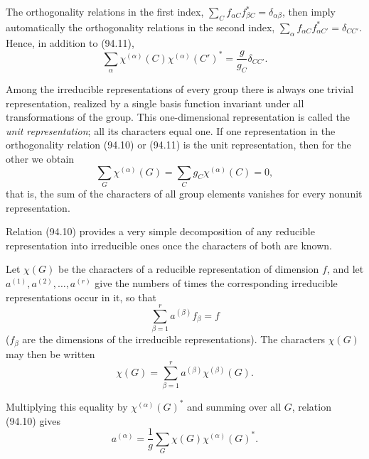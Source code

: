 The orthogonality relations in the first index, $\sum_Cf_{\alpha C}f_{\beta C}^*=\delta_{\alpha\beta}$, then imply automatically the orthogonality relations in the second index, $\sum_\alpha f_{\alpha C}f_{\alpha C'}^*=\delta_{CC'}$. Hence, in addition to (94.11),
\begin{equation}
 \sum_\alpha\chi^{(\alpha)}(C)\chi^{(\alpha)}(C')^*=\frac{g}{g_C}\delta_{CC'}.
 \tag{94.12}
\end{equation}

Among the irreducible representations of every group there is always one trivial representation, realized by a single basis function invariant under all transformations of the group. This one-dimensional representation is called the \emph{unit representation}; all its characters equal one. If one representation in the orthogonality relation (94.10) or (94.11) is the unit representation, then for the other we obtain
\begin{equation}
 \sum_G\chi^{(\alpha)}(G)=\sum_Cg_C\chi^{(\alpha)}(C)=0,
 \tag{94.13}
\end{equation}
that is, the sum of the characters of all group elements vanishes for every nonunit representation.

Relation (94.10) provides a very simple decomposition of any reducible representation into irreducible ones once the characters of both are known.

Let $\chi(G)$ be the characters of a reducible representation of dimension $f$, and let $a^{(1)},a^{(2)},\ldots,a^{(r)}$ give the numbers of times the corresponding irreducible representations occur in it, so that
\begin{equation}
 \sum_{\beta=1}^ra^{(\beta)}f_\beta=f
 \tag{94.14}
\end{equation}
($f_\beta$ are the dimensions of the irreducible representations). The characters $\chi(G)$ may then be written
\begin{equation}
 \chi(G)=\sum_{\beta=1}^ra^{(\beta)}\chi^{(\beta)}(G).
 \tag{94.15}
\end{equation}

Multiplying this equality by $\chi^{(\alpha)}(G)^*$ and summing over all $G$, relation (94.10) gives
\begin{equation}
 a^{(\alpha)}=\frac1g\sum_G\chi(G)\chi^{(\alpha)}(G)^*.
 \tag{94.16}
\end{equation}

